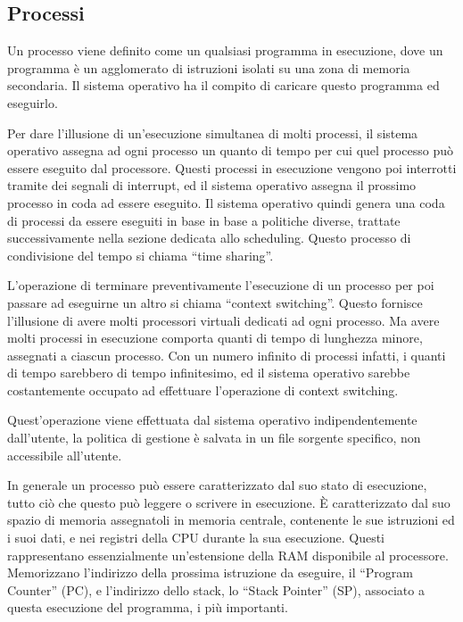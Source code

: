 \documentclass{article}
\numberwithin{equation}{subsection}
\begin{document}
\subsection{Processi}

Un processo viene definito come un qualsiasi programma in esecuzione, dove un programma è un agglomerato di istruzioni isolati su una zona di memoria secondaria. Il 
sistema operativo ha il compito di caricare questo programma ed eseguirlo. 

Per dare l'illusione di un'esecuzione simultanea di molti processi, il sistema operativo assegna ad ogni processo un quanto di tempo per cui quel processo può 
essere eseguito dal processore. Questi processi in esecuzione vengono poi interrotti tramite dei segnali di interrupt, ed il sistema operativo assegna il prossimo 
processo in coda ad essere eseguito. Il sistema operativo quindi genera una coda di processi da essere eseguiti in base in base a politiche diverse, trattate successivamente 
nella sezione dedicata allo scheduling. 
Questo processo di condivisione del tempo si chiama ``time sharing''. 

L'operazione di terminare preventivamente l'esecuzione di un processo per poi passare ad eseguirne un altro si chiama ``context switching''. Questo fornisce l'illusione 
di avere molti processori virtuali dedicati ad ogni processo. Ma avere molti processi in esecuzione comporta quanti di tempo di lunghezza minore, assegnati a ciascun 
processo. Con un numero infinito di processi infatti, i quanti di tempo sarebbero di tempo infinitesimo, ed il sistema operativo sarebbe costantemente occupato ad 
effettuare l'operazione di context switching. 

Quest'operazione viene effettuata dal sistema operativo indipendentemente dall'utente, la politica di gestione è salvata in un file sorgente specifico, non accessibile 
all'utente. 


In generale un processo può essere caratterizzato dal suo stato di esecuzione, tutto ciò che questo può leggere o scrivere in esecuzione. \`{E} caratterizzato dal suo 
spazio di memoria assegnatoli in memoria centrale, contenente le sue istruzioni ed i suoi dati, e nei registri della CPU durante la sua esecuzione. Questi rappresentano 
essenzialmente un'estensione della RAM disponibile al processore. Memorizzano l'indirizzo della prossima istruzione da eseguire, il ``Program Counter'' (PC), e 
l'indirizzo dello stack, lo ``Stack Pointer'' (SP), associato a questa esecuzione del programma, i più importanti. 
\end{document}
